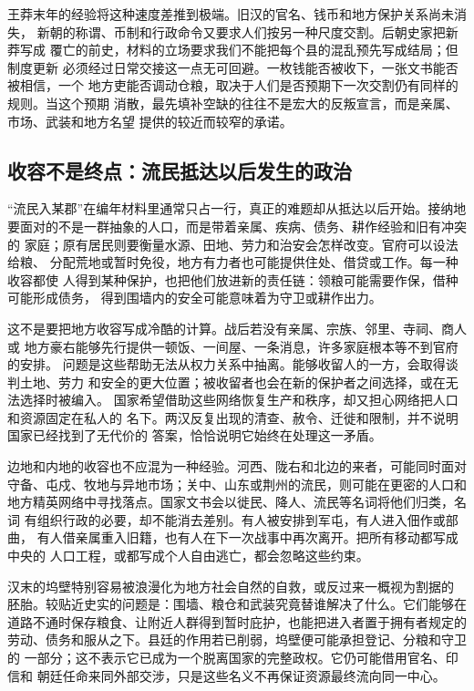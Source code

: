王莽末年的经验将这种速度差推到极端。旧汉的官名、钱币和地方保护关系尚未消失，
新朝的称谓、币制和行政命令又要求人们按另一种尺度交割。后朝史家把新莽写成
覆亡的前史，材料的立场要求我们不能把每个县的混乱预先写成结局；但制度更新
必须经过日常交接这一点无可回避。一枚钱能否被收下，一张文书能否被相信，一个
地方吏能否调动仓粮，取决于人们是否预期下一次交割仍有同样的规则。当这个预期
消散，最先填补空缺的往往不是宏大的反叛宣言，而是亲属、市场、武装和地方名望
提供的较近而较窄的承诺。

\subsection{收容不是终点：流民抵达以后发生的政治}

“流民入某郡”在编年材料里通常只占一行，真正的难题却从抵达以后开始。接纳地
要面对的不是一群抽象的人口，而是带着亲属、疾病、债务、耕作经验和旧有冲突的
家庭；原有居民则要衡量水源、田地、劳力和治安会怎样改变。官府可以设法给粮、
分配荒地或暂时免役，地方有力者也可能提供住处、借贷或工作。每一种收容都使
人得到某种保护，也把他们放进新的责任链：领粮可能需要作保，借种可能形成债务，
得到围墙内的安全可能意味着为守卫或耕作出力。

这不是要把地方收容写成冷酷的计算。战后若没有亲属、宗族、邻里、寺祠、商人或
地方豪右能够先行提供一顿饭、一间屋、一条消息，许多家庭根本等不到官府的安排。
问题是这些帮助无法从权力关系中抽离。能够收留人的一方，会取得谈判土地、劳力
和安全的更大位置；被收留者也会在新的保护者之间选择，或在无法选择时被编入。
国家希望借助这些网络恢复生产和秩序，却又担心网络把人口和资源固定在私人的
名下。两汉反复出现的清查、赦令、迁徙和限制，并不说明国家已经找到了无代价的
答案，恰恰说明它始终在处理这一矛盾。

边地和内地的收容也不应混为一种经验。河西、陇右和北边的来者，可能同时面对
守备、屯戍、牧地与异地市场；关中、山东或荆州的流民，则可能在更密的人口和
地方精英网络中寻找落点。国家文书会以徙民、降人、流民等名词将他们归类，名词
有组织行政的必要，却不能消去差别。有人被安排到军屯，有人进入佃作或部曲，
有人借亲属重入旧籍，也有人在下一次战事中再次离开。把所有移动都写成中央的
人口工程，或都写成个人自由逃亡，都会忽略这些约束。

汉末的坞壁特别容易被浪漫化为地方社会自然的自救，或反过来一概视为割据的
胚胎。较贴近史实的问题是：围墙、粮仓和武装究竟替谁解决了什么。它们能够在
道路不通时保存粮食、让附近人群得到暂时庇护，也能把进入者置于拥有者规定的
劳动、债务和服从之下。县廷的作用若已削弱，坞壁便可能承担登记、分粮和守卫的
一部分；这不表示它已成为一个脱离国家的完整政权。它仍可能借用官名、印信和
朝廷任命来同外部交涉，只是这些名义不再保证资源最终流向同一中心。


